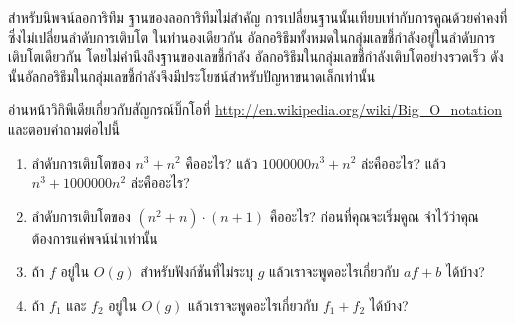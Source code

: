 สำหรับนิพจน์ลอการิทึม ฐานของลอการิทึมไม่สำคัญ การเปลี่ยนฐานนั้นเทียบเท่ากับการคูณด้วยค่าคงที่ซึ่งไม่เปลี่ยนลำดับการเติบโต 
ในทำนองเดียวกัน อัลกอริธึมทั้งหมดในกลุ่มเลขชี้กำลังอยู่ในลำดับการเติบโตเดียวกัน โดยไม่คำนึงถึงฐานของเลขชี้กำลัง 
อัลกอริธึมในกลุ่มเลขชี้กำลังเติบโตอย่างรวดเร็ว ดังนั้นอัลกอริธึมในกลุ่มเลขชี้กำลังจึงมีประโยชน์สำหรับปัญหาขนาดเล็กเท่านั้น


\begin{exercise}


อ่านหน้าวิกิพีเดียเกี่ยวกับสัญกรณ์บิ๊กโอที่ \url{http://en.wikipedia.org/wiki/Big_O_notation} และตอบคำถามต่อไปนี้

\begin{enumerate}

\item ลำดับการเติบโตของ {\scriptsize$n^3 + n^2$} คืออะไร? 
แล้ว {\scriptsize$1000000 n^3 + n^2$} ล่ะคืออะไร? 
แล้ว {\scriptsize$n^3 + 1000000 n^2$} ล่ะคืออะไร? 


\item ลำดับการเติบโตของ {\scriptsize$(n^2 + n) \cdot (n + 1)$} คืออะไร? ก่อนที่คุณจะเริ่มคูณ จำไว้ว่าคุณต้องการแค่พจน์นำเท่านั้น

  
\item ถ้า {\scriptsize$f$} อยู่ใน {\scriptsize$O(g)$} สำหรับฟังก์ชันที่ไม่ระบุ {\scriptsize$g$} แล้วเราจะพูดอะไรเกี่ยวกับ {\scriptsize$af+b$} ได้บ้าง?


\item ถ้า {\scriptsize$f_1$} และ {\scriptsize$f_2$} อยู่ใน {\scriptsize$O(g)$} แล้วเราจะพูดอะไรเกี่ยวกับ {\scriptsize$f_1 + f_2$} ได้บ้าง?


\end{enumerate}
\end{exercise}
